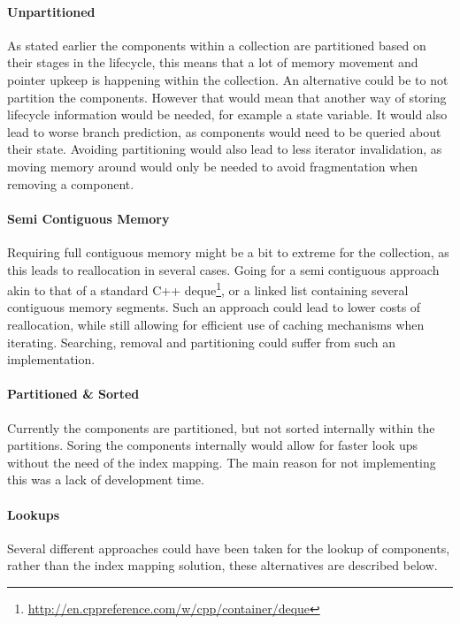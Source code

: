 \paragraph{Unpartitioned}
As stated earlier the components within a collection are partitioned based on their stages in the lifecycle,
this means that a lot of memory movement and pointer upkeep is happening within the collection.
An alternative could be to not partition the components. However that would mean that another way of storing
lifecycle information would be needed, for example a state variable.
It would also lead to worse branch prediction, as components would need to be queried about their state.
Avoiding partitioning would also lead to less iterator invalidation, as moving memory around would
only be needed to avoid fragmentation when removing a component.

\paragraph{Semi Contiguous Memory}
Requiring full contiguous memory might be a bit to extreme for the collection, as this leads to
reallocation in several cases. Going for a semi contiguous approach akin to that of a standard C++ deque\footnote{\url{http://en.cppreference.com/w/cpp/container/deque}},
or a linked list containing several contiguous memory segments.
Such an approach could lead to lower costs of reallocation, while still allowing for efficient use of caching mechanisms
when iterating.
Searching, removal and partitioning could suffer from such an implementation.

\paragraph{Partitioned \& Sorted}
Currently the components are partitioned, but not sorted internally within the partitions.
Soring the components internally would allow for faster look ups without the need of the index mapping.
The main reason for not implementing this was a lack of development time.

\paragraph{Lookups}
Several different approaches could have been taken for the lookup of components, rather than the index mapping solution,
these alternatives are described below.

